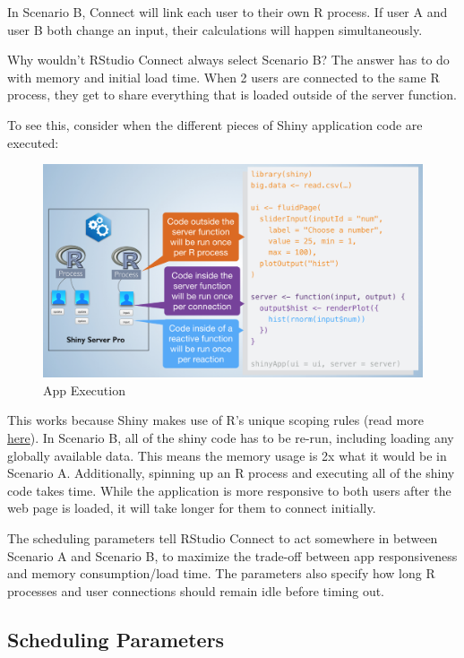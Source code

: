 \documentclass[]{book}
\theoremstyle{definition}
\theoremstyle{definition}
\theoremstyle{definition}
\theoremstyle{remark}
\begin{document}
In Scenario B, Connect will link each user to their own R process. If
user A and user B both change an input, their calculations will happen
simultaneously.

Why wouldn't RStudio Connect always select Scenario B? The answer has to
do with memory and initial load time. When 2 users are connected to the
same R process, they get to share everything that is loaded outside of
the server function.

To see this, consider when the different pieces of Shiny application
code are executed:

\begin{figure}
\centering
\includegraphics{imgs/scaling/app-execution.png}
\caption{App Execution}
\end{figure}

This works because Shiny makes use of R's unique scoping rules (read
more \href{http://shiny.rstudio.com/articles/scoping.html}{here}). In
Scenario B, all of the shiny code has to be re-run, including loading
any globally available data. This means the memory usage is 2x what it
would be in Scenario A. Additionally, spinning up an R process and
executing all of the shiny code takes time. While the application is
more responsive to both users after the web page is loaded, it will take
longer for them to connect initially.

The scheduling parameters tell RStudio Connect to act somewhere in
between Scenario A and Scenario B, to maximize the trade-off between app
responsiveness and memory consumption/load time. The parameters also
specify how long R processes and user connections should remain idle
before timing out.

\hypertarget{scheduling-parameters}{%
\subsection{Scheduling Parameters}\label{scheduling-parameters}}
\end{document}
